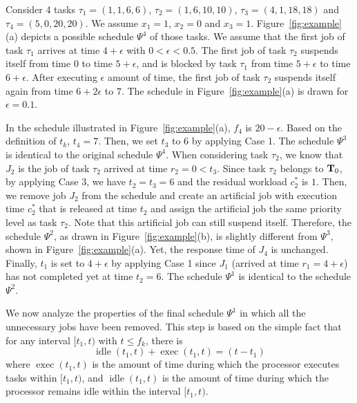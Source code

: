 \begin{example}
\label{ex:proof_step1}
Consider 4 tasks $\tau_1 =(1,1,6,6)$, $\tau_2 =(1,6,10,10)$, $\tau_3 =(4,1,18,18)$ and $\tau_4 =(5,0,20,20)$.
We assume $x_1=1$, $x_2=0$ and $x_3=1$.
Figure~\ref{fig:example}(a) depicts a possible schedule $\Psi^4$ of those tasks. We assume that the first job of task $\tau_1$ arrives
at time $4+\epsilon$ with $0 < \epsilon < 0.5$. The first job
of task $\tau_2$ suspends itself from time $0$ to time $5+\epsilon$,
and is blocked by task $\tau_1$ from time $5+\epsilon$ to time
$6+\epsilon$. After executing $\epsilon$ amount
of time, the first job of task $\tau_2$ suspends itself again from
time $6+2\epsilon$ to $7$. The schedule in Figure~\ref{fig:example}(a) is drawn for $\epsilon=0.1$.
   
In the schedule illustrated in Figure~\ref{fig:example}(a), $f_4$ is
$20-\epsilon$.  Based on the definition of $t_k$, $t_4=7$. Then, we set $t_3$ to $6$ by applying Case 1. The
schedule $\Psi^3$ is identical to the original schedule $\Psi^4$. When considering task $\tau_2$, we know that $J_2$ is the job of task
$\tau_2$ arrived at time $r_2 = 0 < t_3$. Since task $\tau_2$ belongs to ${\bf
  T}_0$, by applying Case 3, we have $t_2=t_3=6$ and the
residual workload $c_2^*$ is $1$. Then, we remove job $J_2$ from the
schedule and create an artificial job with execution time $c_2^*$ that
is released at time $t_2$ and assign the artificial job the same priority level as task
$\tau_2$. Note that this artificial job can still suspend itself. Therefore, the schedule $\Psi^2$, as drawn in 
Figure~\ref{fig:example}(b), is slightly different from $\Psi^3$, shown in Figure~\ref{fig:example}(a). Yet, the response time of $J_4$ is unchanged. Finally, $t_1$ is set to $4+\epsilon$ by applying Case 1 since
$J_1$ (arrived at time $r_1=4+\epsilon$) has not completed yet at time
$t_2=6$.  The schedule $\Psi^1$ is identical to the schedule
$\Psi^2$.
\myendproof
\end{example}


We now analyze the properties of the final schedule $\Psi^1$ in which
all the unnecessary jobs have been removed. %
This step is based on the simple fact that for any interval $[t_1, t)$ with $t \leq f_k$, there is 
\begin{equation}
\label{eq:exec_plus_idle}
\operatorname{idle}(t_1, t) + \operatorname{exec}(t_1, t)  = (t - t_1)
\end{equation}
where $\operatorname{exec}(t_1, t)$ is the amount of time during which the processor executes tasks within $[t_1, t)$, and $\operatorname{idle}(t_1, t)$ is the amount of time during which the processor remains idle within the interval $[t_1, t)$.

